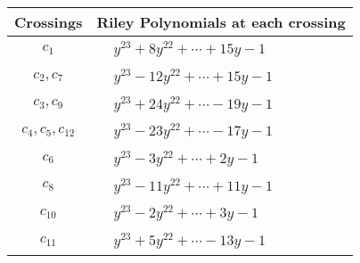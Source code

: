 \documentclass[1p]{elsarticle_modified}
\theoremstyle{definition}
\begin{document}
\begin{tabular}{m{50pt}|m{274pt}}
Crossings & \hspace{64pt}Riley Polynomials at each crossing \\
\hline $$\begin{aligned}c_{1}\end{aligned}$$&$\begin{aligned}
&y^{23}+8 y^{22}+\cdots+15 y-1
\end{aligned}$\\
\hline $$\begin{aligned}c_{2},c_{7}\end{aligned}$$&$\begin{aligned}
&y^{23}-12 y^{22}+\cdots+15 y-1
\end{aligned}$\\
\hline $$\begin{aligned}c_{3},c_{9}\end{aligned}$$&$\begin{aligned}
&y^{23}+24 y^{22}+\cdots-19 y-1
\end{aligned}$\\
\hline $$\begin{aligned}c_{4},c_{5},c_{12}\end{aligned}$$&$\begin{aligned}
&y^{23}-23 y^{22}+\cdots-17 y-1
\end{aligned}$\\
\hline $$\begin{aligned}c_{6}\end{aligned}$$&$\begin{aligned}
&y^{23}-3 y^{22}+\cdots+2 y-1
\end{aligned}$\\
\hline $$\begin{aligned}c_{8}\end{aligned}$$&$\begin{aligned}
&y^{23}-11 y^{22}+\cdots+11 y-1
\end{aligned}$\\
\hline $$\begin{aligned}c_{10}\end{aligned}$$&$\begin{aligned}
&y^{23}-2 y^{22}+\cdots+3 y-1
\end{aligned}$\\
\hline $$\begin{aligned}c_{11}\end{aligned}$$&$\begin{aligned}
&y^{23}+5 y^{22}+\cdots-13 y-1
\end{aligned}$\\
\hline
\end{tabular}\\~\\
\end{document}
